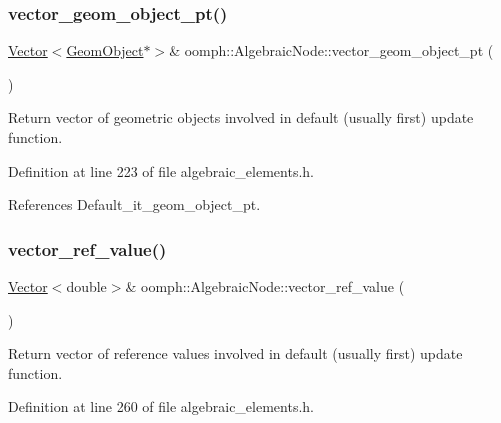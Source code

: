 \subsubsection{\texorpdfstring{vector\+\_\+geom\+\_\+object\+\_\+pt()}{vector\_geom\_object\_pt()}\hspace{0.1cm}{\footnotesize\ttfamily [2/2]}}
{\footnotesize\ttfamily \hyperlink{classoomph_1_1Vector}{Vector}$<$\hyperlink{classoomph_1_1GeomObject}{Geom\+Object}$\ast$$>$\& oomph\+::\+Algebraic\+Node\+::vector\+\_\+geom\+\_\+object\+\_\+pt (\begin{DoxyParamCaption}{ }\end{DoxyParamCaption})\hspace{0.3cm}{\ttfamily [inline]}}



Return vector of geometric objects involved in default (usually first) update function. 



Definition at line 223 of file algebraic\+\_\+elements.\+h.



References Default\+\_\+it\+\_\+geom\+\_\+object\+\_\+pt.

\mbox{\label{classoomph_1_1AlgebraicNode_ad2236d78dd07f59345ee7a8275d3fefb}} 
\subsubsection{\texorpdfstring{vector\+\_\+ref\+\_\+value()}{vector\_ref\_value()}\hspace{0.1cm}{\footnotesize\ttfamily [1/2]}}
{\footnotesize\ttfamily \hyperlink{classoomph_1_1Vector}{Vector}$<$double$>$\& oomph\+::\+Algebraic\+Node\+::vector\+\_\+ref\+\_\+value (\begin{DoxyParamCaption}{ }\end{DoxyParamCaption})\hspace{0.3cm}{\ttfamily [inline]}}



Return vector of reference values involved in default (usually first) update function. 



Definition at line 260 of file algebraic\+\_\+elements.\+h.




